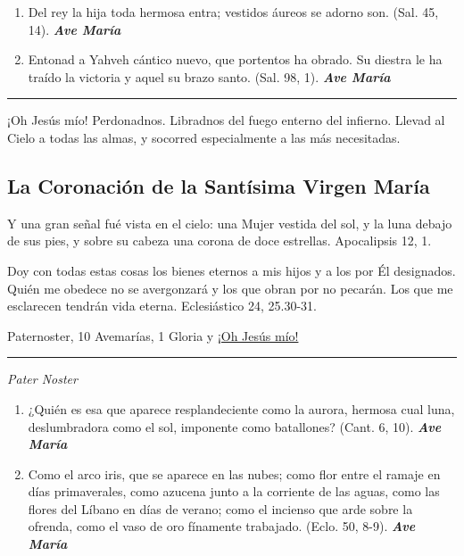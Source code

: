 \documentclass[a4paper,11pt, oneside]{report}
\begin{document}
{{\begin{enumerate}
        \item Del rey la hija toda hermosa entra; vestidos áureos se adorno son. (Sal. 45, 14). \textbf{\textit{Ave María}}

        \item Entonad a Yahveh cántico nuevo, que portentos ha obrado. Su diestra le ha traído la victoria y aquel su brazo santo. (Sal. 98, 1). \textbf{\textit{Ave María}}

      \end{enumerate}      

      \begin{center}\rule{1\linewidth}{\linethickness}\end{center}      

      \medskip
      \hypertarget{finalAsuncion}{¡Oh Jesús mío! Perdonadnos. Libradnos del fuego enterno del infierno. Llevad al Cielo a todas las almas, y socorred especialmente a las más 
      necesitadas.}
    }

  \subsection*{La Coronación de la Santísima Virgen María}
    {
      Y una gran señal fué vista en el cielo: una Mujer vestida del sol, y la luna debajo de sus pies, y sobre su cabeza una corona de doce estrellas.
      Apocalipsis 12, 1.

      \medskip
      Doy con todas estas cosas los bienes eternos a mis hijos y a los por Él designados. Quién me obedece no se avergonzará y los que obran por
      no pecarán. Los que me esclarecen tendrán vida eterna. Eclesiástico 24, 25.30-31.

       Paternoster, 10 Avemarías, 1 Gloria y \hyperlink{finalCoronacion}{¡Oh Jesús mío!}

      \begin{center}\rule{1\linewidth}{\linethickness}\end{center}

      \medskip
      \textit{Pater Noster}

      \begin{enumerate}

        \item ¿Quién es esa que aparece resplandeciente como la aurora,
        hermosa cual luna, deslumbradora como el sol, imponente como batallones? (Cant. 6, 10). \textbf{\textit{Ave María}}

        \item Como el arco iris, que se aparece en las nubes; como flor entre el ramaje en días primaverales, como azucena junto
        a la corriente de las aguas, como las flores del Líbano en días de verano; como el incienso que arde sobre la ofrenda,
        como el vaso de oro fínamente trabajado. (Eclo. 50, 8-9). \textbf{\textit{Ave María}}


\end{enumerate}}}
\end{document}
